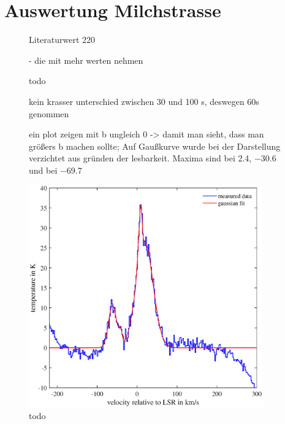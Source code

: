 \section{Auswertung Milchstrasse}
\begin{figure}[H]
    \centering
    
    \caption{Literaturwert \SI{220}{} \cite{LSR}}
    \label{fig:VvonR}
\end{figure}

\begin{figure}[H]
    \centering
       
    \caption{- die mit mehr werten nehmen}
    \label{fig:Milchstrassesafe}
\end{figure}

\begin{figure}[H]
    \centering
       
    \caption{todo}
    \label{fig:Belichtungszeit}
\end{figure}

\begin{figure}[H]
    \centering
       
    \caption{kein krasser unterschied zwischen 30 und 100 s, deswegen 60s genommen}
    \label{fig:BelichtungszeitExtremal}
\end{figure}

\begin{figure}[H]
    \centering
       
    \caption{ein plot zeigen mit b ungleich 0 -> damit man sieht, dass man größers b machen sollte; Auf Gaußkurve wurde bei der Darstellung verzichtet aus gründen der lesbarkeit. Maxima sind bei \SI{2.4}{}, \SI{-30.6}{} und bei \SI{-69.7}{}}
    \label{fig:bungleichnull}
\end{figure}

\begin{figure}[H]
    \centering
    \includegraphics[width= 0.9\textwidth]{plots/TestBaseline.eps}
    \caption{todo}
    \label{fig:TestBaseline}
\end{figure}